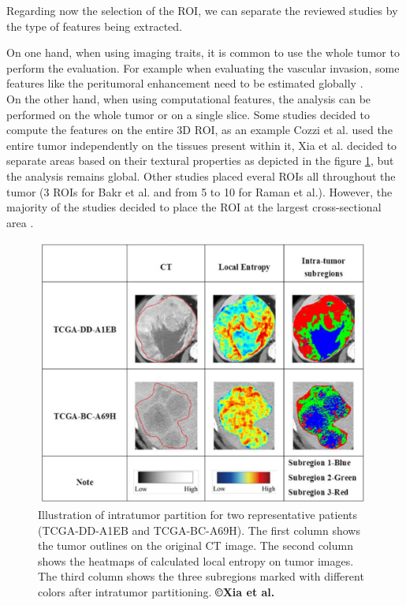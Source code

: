 \documentclass[]{article}
\begin{document}
Regarding now the selection of the ROI, we can separate the reviewed
studies by the type of features being extracted.

On one hand, when using imaging traits, it is common to use the whole
tumor to perform the evaluation. For example when evaluating the
vascular invasion, some features like the peritumoral enhancement need
to be estimated globally \cite{Renzulli2016,Banerjee2015,Segal2007,Kuo2007}.\\
On the other hand, when using computational features, the analysis can
be performed on the whole tumor or on a single slice. Some studies
decided to compute the features on the entire 3D ROI, as an example Cozzi et al. used the entire tumor independently on
the tissues present within it, Xia et al. decided to separate
areas based on their textural properties as depicted in the figure \ref{XiaFig_subregions}, but the
analysis remains global. Other studies placed everal ROIs all throughout
the tumor (3 ROIs for Bakr et al. and from 5 to 10 for
Raman et al.). However, the majority of the studies decided to
place the ROI at the largest cross-sectional area \cite{Li2016,Chen2017,Zhou2017a,Akai2018,Zheng2018}.

\begin{figure}[ht!]
\centering
\includegraphics[width=4.34043in,height=3.46021in]{./images/image16.png}
\caption{Illustration of intratumor partition for two representative
patients (TCGA-DD-A1EB and TCGA-BC-A69H). The first column shows the
tumor outlines on the original CT image. The second column shows the
heatmaps of calculated local entropy on tumor images. The third column
shows the three subregions marked with different colors after intratumor
partitioning. \textbf{©Xia et al.} \cite{Xia2018}}
\label{XiaFig_subregions}
\end{figure}
\end{document}
